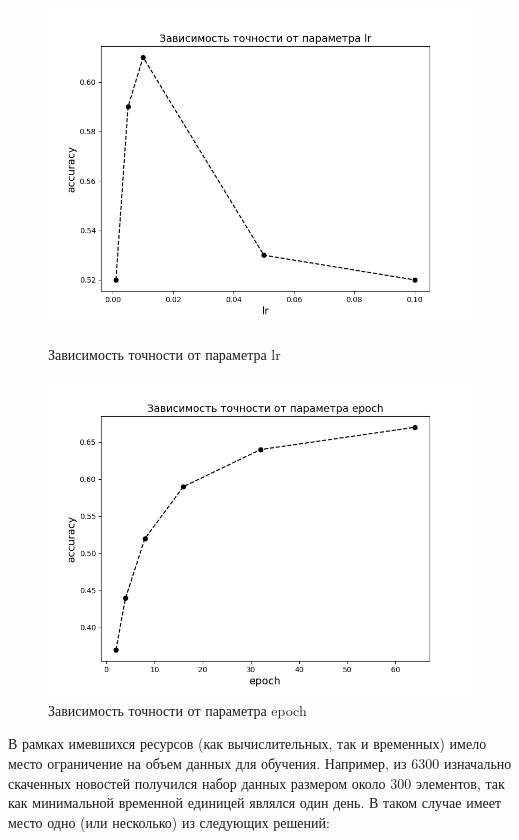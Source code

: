 \documentclass[14pt]{matmex-diploma-custom}
\begin{document}
\begin{figure}[!htb]
\includegraphics[width=\linewidth]{img/lr}
\caption{Зависимость точности от параметра lr}
\label{img:lr}
\endminipage
\hfill
{}
\includegraphics[width=\linewidth]{img/epoch}
\caption{Зависимость точности от параметра epoch}
\label{img:epoch}
\endminipage
\end{figure}

В рамках имевшихся ресурсов (как вычислительных, так и временных) имело место ограничение на объем данных для обучения. Например, из 6300 изначально скаченных новостей получился набор данных размером около 300 элементов, так как минимальной временной единицей являлся один день. В таком случае имеет место одно (или несколько) из следующих решений:
\end{document}
